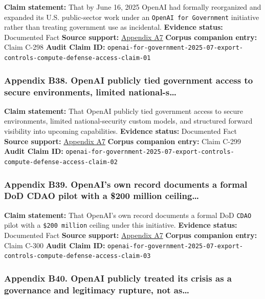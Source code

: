 \documentclass[
  american,
  11pt,
  letterpaper,
]{article}
\begin{document}
\textbf{Claim statement:} That by June 16, 2025 OpenAI had formally
reorganized and expanded its U.S. public-sector work under an
\texttt{OpenAI\ for\ Government} initiative rather than treating
government use as incidental. \textbf{Evidence status:} Documented Fact
\textbf{Source support:}
\hyperref[appendix-a7-introducing-openai-for-government]{Appendix A7}
\textbf{Corpus companion entry:} Claim C-298 \textbf{Audit Claim ID:}
\texttt{openai-for-government-2025-07-export-controls-compute-defense-access-claim-01}

\subsubsection{Appendix B38. OpenAI publicly tied government access to
secure environments, limited
national-s\ldots{}}\label{appendix-b38-openai-publicly-tied-government-access-to-secure-environments-limited-national-s}

\textbf{Claim statement:} That OpenAI publicly tied government access to
secure environments, limited national-security custom models, and
structured forward visibility into upcoming capabilities.
\textbf{Evidence status:} Documented Fact \textbf{Source support:}
\hyperref[appendix-a7-introducing-openai-for-government]{Appendix A7}
\textbf{Corpus companion entry:} Claim C-299 \textbf{Audit Claim ID:}
\texttt{openai-for-government-2025-07-export-controls-compute-defense-access-claim-02}

\subsubsection{Appendix B39. OpenAI's own record documents a formal DoD
CDAO pilot with a \$200 million
ceiling\ldots{}}\label{appendix-b39-openai-s-own-record-documents-a-formal-dod-cdao-pilot-with-a-200-million-ceiling}

\textbf{Claim statement:} That OpenAI's own record documents a formal
DoD \texttt{CDAO} pilot with a \texttt{\$200\ million} ceiling under
this initiative. \textbf{Evidence status:} Documented Fact
\textbf{Source support:}
\hyperref[appendix-a7-introducing-openai-for-government]{Appendix A7}
\textbf{Corpus companion entry:} Claim C-300 \textbf{Audit Claim ID:}
\texttt{openai-for-government-2025-07-export-controls-compute-defense-access-claim-03}

\subsubsection{Appendix B40. OpenAI publicly treated its crisis as a
governance and legitimacy rupture, not
as\ldots{}}\label{appendix-b40-openai-publicly-treated-its-crisis-as-a-governance-and-legitimacy-rupture-not-as}
\end{document}
